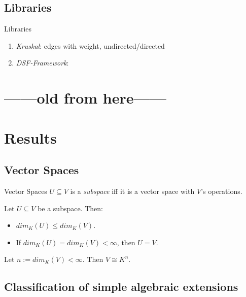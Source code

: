 \documentclass[%
	sans,
	12pt,
]{beamer}
\begin{document}
\subsection{Libraries}
\begin{frame}{Libraries}
\begin{enumerate}
	\item \textit{Kruskal}: edges with weight, undirected/directed
	\item \textit{DSF-Framework}:
\end{enumerate}
\end{frame}

\section{------old from here------}
\section{Results} %

\subsection{Vector Spaces}
\begin{frame}{Vector Spaces}\pause
$U \subseteq V$ is a \emph{subspace} iff it is a vector space with $V$'s operations.
\begin{theorem}
\upshape
Let $U \subseteq V$ be a subspace. Then:
\begin{itemize}
	\item $dim_K(U) \le dim_K(V)$.
	\item If $dim_K(U)=dim_K(V) < \infty$, then $U = V$.
\end{itemize} %
\end{theorem}\pause
\begin{theorem}
\upshape
Let $n := dim_K(V) < \infty$. Then $V \cong K^n$.
\end{theorem}
\end{frame}

\subsection{Classification of simple algebraic extensions}
\end{document}

